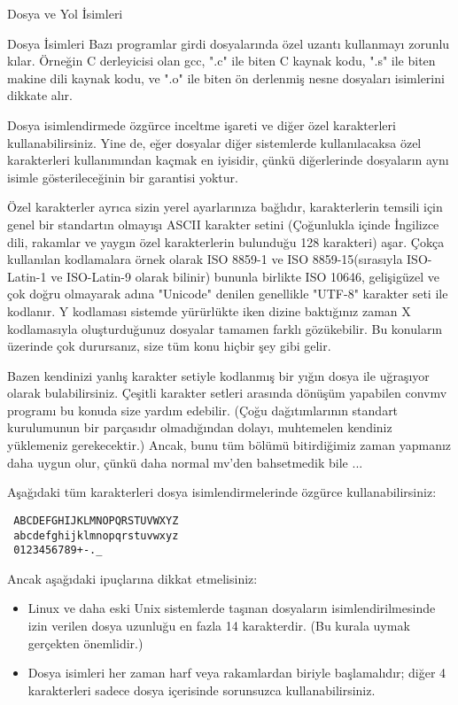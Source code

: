 \begin{section}{Dosya ve Yol İsimleri}
\begin{subsection}{Dosya İsimleri}
	Bazı programlar girdi dosyalarında özel uzantı kullanmayı zorunlu kılar. Örneğin C derleyicisi olan gcc, ".c" ile biten C kaynak kodu, ".s" ile biten makine dili kaynak kodu, ve ".o" ile biten ön derlenmiş nesne dosyaları isimlerini dikkate alır.
	
	Dosya isimlendirmede özgürce inceltme işareti ve diğer özel karakterleri kullanabilirsiniz. Yine de, eğer dosyalar diğer sistemlerde kullanılacaksa özel karakterleri kullanımından kaçmak en iyisidir, çünkü diğerlerinde dosyaların aynı isimle gösterileceğinin bir garantisi yoktur.
	
	Özel karakterler ayrıca sizin yerel ayarlarınıza bağlıdır, karakterlerin temsili için genel bir standartın olmayışı ASCII karakter setini (Çoğunlukla içinde İngilizce dili, rakamlar ve yaygın özel karakterlerin bulunduğu 128 karakteri) aşar. Çokça kullanılan kodlamalara örnek olarak ISO 8859-1 ve ISO 8859-15(sırasıyla ISO-Latin-1 ve ISO-Latin-9 olarak bilinir) bununla birlikte ISO 10646, gelişigüzel ve çok doğru olmayarak adına "Unicode" denilen genellikle "UTF-8" karakter seti ile kodlanır. Y kodlaması sistemde yürürlükte iken dizine baktığınız zaman X kodlamasıyla oluşturduğunuz dosyalar tamamen farklı gözükebilir. Bu konuların üzerinde çok durursanız, size tüm konu hiçbir şey gibi gelir.
	
	Bazen kendinizi yanlış karakter setiyle kodlanmış bir yığın dosya ile uğraşıyor olarak bulabilirsiniz. Çeşitli karakter setleri arasında dönüşüm yapabilen convmv programı bu konuda size yardım edebilir. (Çoğu dağıtımlarının standart kurulumunun bir parçasıdır olmadığından dolayı, muhtemelen kendiniz yüklemeniz gerekecektir.) Ancak, bunu tüm bölümü bitirdiğimiz zaman yapmanız daha uygun olur, çünkü daha normal mv'den bahsetmedik bile ...
	
Aşağıdaki tüm karakterleri dosya isimlendirmelerinde özgürce kullanabilirsiniz:
\begin{verbatim}
 ABCDEFGHIJKLMNOPQRSTUVWXYZ
 abcdefghijklmnopqrstuvwxyz
 0123456789+-._
\end{verbatim}

Ancak aşağıdaki ipuçlarına dikkat etmelisiniz:
\begin{itemize}
\item Linux ve daha eski Unix sistemlerde taşınan dosyaların isimlendirilmesinde izin verilen dosya uzunluğu en fazla 14 karakterdir. (Bu kurala uymak gerçekten önemlidir.)
\item Dosya isimleri her zaman harf veya rakamlardan biriyle başlamalıdır; diğer 4 karakterleri sadece dosya içerisinde sorunsuzca kullanabilirsiniz.
\end{itemize}


\end{subsection}
\end{section}

